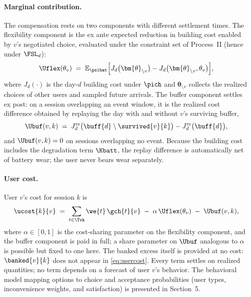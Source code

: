 \paragraph{Marginal contribution.} The compensation rests on two
components with different settlement times. The flexibility component is
the ex ante expected reduction in building cost enabled by $v$'s
negotiated choice, evaluated under the constraint set of Process~II
(hence under $\FSL_d$):
\begin{equation}\label{eq:uflex}
\Uflex(\theta_v) \;=\; \mathbb{E}_{\psihat}\Bigl[
J_d\bigl(\bm{\theta}_{\setminus v}\bigr) -
J_d\bigl(\bm{\theta}_{\setminus v}, \theta_v\bigr) \Bigr],
\end{equation}
where $J_d(\cdot)$ is the day-$d$ building cost under $\pich$ and
$\bm{\theta}_{\setminus v}$ collects the realized choices of other users
and sampled future arrivals. The buffer component settles ex post: on a
session overlapping an event window, it is the realized cost difference
obtained by replaying the day with and without $v$'s surviving buffer,
\begin{equation}\label{eq:ubuf}
\Ubuf(v,k) \;=\;
J^{\mathrm{re}}_d\bigl(\buff{d} \setminus \survived{v}{k}\bigr) -
J^{\mathrm{re}}_d\bigl(\buff{d}\bigr),
\end{equation}
and $\Ubuf(v,k) = 0$ on sessions overlapping no event. Because the
building cost includes the degradation term $\Kbatt$, the replay
difference is automatically net of battery wear; the user never bears
wear separately.

\paragraph{User cost.} User $v$'s cost for session $k$ is
\begin{equation}\label{eq:usercost}
\ucost{k}{v} \;=\; \sum_{t \in \Tvk} \we{t}\,\gch{t}{v}
\;-\; \alpha\,\Uflex(\theta_v) \;-\; \Ubuf(v,k),
\end{equation}
where $\alpha \in [0,1]$ is the cost-sharing parameter on the
flexibility component, and the buffer component is paid in full; a share
parameter on $\Ubuf$ analogous to $\alpha$ is possible but fixed to one
here. The banked excess itself is provided at no cost: $\banked{v}{k}$
does not appear in \eqref{eq:usercost}. Every term settles on realized
quantities; no term depends on a forecast of user $v$'s behavior. The
behavioral model mapping options to choice and acceptance probabilities
(user types, inconvenience weights, and satisfaction) is presented in
Section~5.

